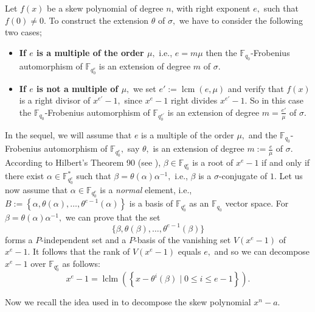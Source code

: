 \documentclass[12pt,paper]{article}
\theoremstyle{plain}
\DeclareMathOperator{\lcm}{lcm}
\DeclareMathOperator{\lclm}{lclm}
\begin{document}
Let  $f(x)$ be a skew polynomial of degree $n$, with right exponent $e ,$ such that $f(0)\ne 0.$ To construct the  extension $\theta$ of $\sigma,$ we have to consider the following two cases; 
        \begin{itemize}
            \item[•] \textbf{If $e$ is a multiple of the order  $\mu,$} i.e., $e=m\mu$ then the   $\mathbb{F}_{q_0}$-Frobenius automorphism of $ \mathbb{F}_{q_0^e}$ is an   extension of degree $m$ of $\sigma.$ 
          
           \item[•] \textbf{If  $e$ is not a multiple of $\mu,$}  we set  $e':=\lcm(e,\mu)$ and  verify that $ f(x)$ is a right divisor of $ x^{e'}-1,$ since $x^e-1$ right divides $ x^{e'}-1.$  So in this case  the   $\mathbb{F}_{q_0}$-Frobenius automorphism of $ \mathbb{F}_{q_0^{e'}}$ is  an extension of degree 
           $m =\frac{e'}{\mu}$ of $\sigma.$ 
            \end{itemize}
In the sequel, we will assume that $ e$ is a multiple of the order  $\mu,$   and the  $\mathbb{F}_{q_0}$-Frobenius automorphism of $ \mathbb{F}_{q_0^e},$ say $\theta,$ is an extension of degree $m:= \frac{e}{\mu}$ of $\sigma.$  According to  Hilbert's Theorem 90 (see \cite[Chapter VI; Theorem 6.1]{Lang2002}),  $\beta \in \mathbb{F}_{q_0^e} $ is a root of $x^e-1$ if and only if there exist $ \alpha \in \mathbb{F}_{q_0^{e}}^* $ such that  
   $\beta=\theta(\alpha) \alpha^{-1},$ i.e.,   $\beta$ is a $\sigma$-conjugate of $1$.   
   Let us now assume that  $\alpha \in \mathbb{F}_{q_0^e}$ is a \emph{normal} element, i.e., $ B:=\left\{\alpha, \theta(\alpha), \ldots, \theta^{e-1}(\alpha)\right\}$ is a basis of $\mathbb{F}_{q_0^e}$ as an $\mathbb F_{q_0}$ vector space.  For $\beta =\theta(\alpha)\alpha^{-1},$ we can prove that the set
   $$  \{ \beta, \theta(\beta), \ldots,  \theta^{e-1}(\beta)\}$$ forms a $P$-independent set and  a $P$-basis  of  the vanishing set  $V(x^e-1) $  of $x^e-1.$ It follows that the rank of $V(x^e-1) $ equals $e,$ and so we can decompose $x^e-1$ over $ \mathbb{F}_{q_0^{e}} $ as follows:     
      $$
x^e-1=\lclm(\left\{x-\theta^i(\beta) \mid 0 \leq i \leq e-1\right\}).
$$

Now we recall the idea used in \cite{Cathryn2024, Lobillo2025} to decompose the skew polynomial $x^n-a.$
\end{document}
